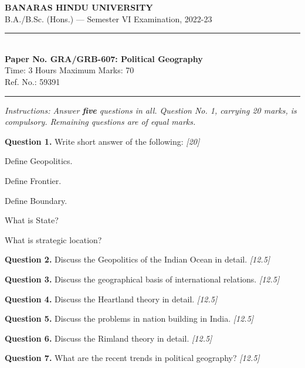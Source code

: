\documentclass[11pt,a4paper]{article}
\newcommand{\pts}[1]{\hfill   \textit{[#1]}}
\begin{document}
\begin{center}
  {\large\bfseries BANARAS HINDU UNIVERSITY}\\[2pt]
  {\normalsize B.A./B.Sc. (Hons.) --- Semester VI Examination, 2022-23}\\[6pt]
  \rule{0.8\linewidth}{0.5pt}\\[6pt]
  {\large\bfseries Paper No. GRA/GRB-607: Political Geography}\\[4pt]
  {\normalsize Time: 3 Hours \hfill Maximum Marks: 70}\\[2pt]
  {\small Ref. No.: 59391}
\end{center}
\rule{\linewidth}{0.4pt}
\smallskip



\noindent   \textit{Instructions: Answer   \textbf{five} questions in all. Question No. 1, carrying 20 marks, is compulsory. Remaining questions are of equal marks.}
\bigskip




\noindent   \textbf{Question 1.} Write short answer of the following: \pts{20}

\begin{parts}
  \item Define Geopolitics.
  \item Define Frontier.
  \item Define Boundary.
  \item What is State?
  \item What is strategic location?
\end{parts}

\medskip


\noindent   \textbf{Question 2.} Discuss the Geopolitics of the Indian Ocean in detail. \pts{12.5}

\medskip


\noindent   \textbf{Question 3.} Discuss the geographical basis of international relations. \pts{12.5}

\medskip


\noindent   \textbf{Question 4.} Discuss the Heartland theory in detail. \pts{12.5}

\medskip


\noindent   \textbf{Question 5.} Discuss the problems in nation building in India. \pts{12.5}

\medskip


\noindent   \textbf{Question 6.} Discuss the Rimland theory in detail. \pts{12.5}

\medskip


\noindent   \textbf{Question 7.} What are the recent trends in political geography? \pts{12.5}
\end{document}
